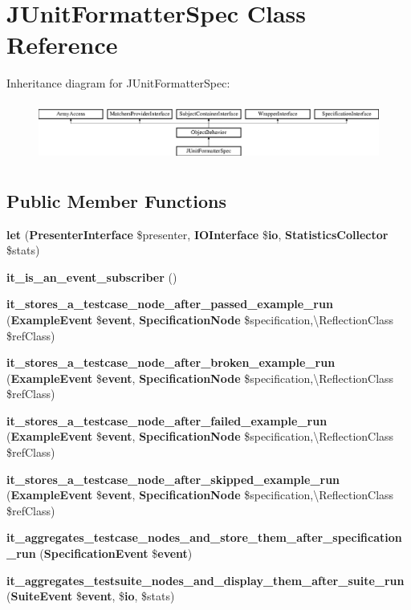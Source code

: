 \section{J\+Unit\+Formatter\+Spec Class Reference}
\label{classspec_1_1_php_spec_1_1_formatter_1_1_j_unit_formatter_spec}
Inheritance diagram for J\+Unit\+Formatter\+Spec\+:\begin{figure}[H]
\begin{center}
\leavevmode
\includegraphics[height=1.953488cm]{classspec_1_1_php_spec_1_1_formatter_1_1_j_unit_formatter_spec}
\end{center}
\end{figure}
\subsection*{Public Member Functions}
\begin{DoxyCompactItemize}
\item 
{\bf let} ({\bf Presenter\+Interface} \$presenter, {\bf I\+O\+Interface} \${\bf io}, {\bf Statistics\+Collector} \$stats)
\item 
{\bf it\+\_\+is\+\_\+an\+\_\+event\+\_\+subscriber} ()
\item 
{\bf it\+\_\+stores\+\_\+a\+\_\+testcase\+\_\+node\+\_\+after\+\_\+passed\+\_\+example\+\_\+run} ({\bf Example\+Event} \${\bf event}, {\bf Specification\+Node} \$specification,\textbackslash{}Reflection\+Class \$ref\+Class)
\item 
{\bf it\+\_\+stores\+\_\+a\+\_\+testcase\+\_\+node\+\_\+after\+\_\+broken\+\_\+example\+\_\+run} ({\bf Example\+Event} \${\bf event}, {\bf Specification\+Node} \$specification,\textbackslash{}Reflection\+Class \$ref\+Class)
\item 
{\bf it\+\_\+stores\+\_\+a\+\_\+testcase\+\_\+node\+\_\+after\+\_\+failed\+\_\+example\+\_\+run} ({\bf Example\+Event} \${\bf event}, {\bf Specification\+Node} \$specification,\textbackslash{}Reflection\+Class \$ref\+Class)
\item 
{\bf it\+\_\+stores\+\_\+a\+\_\+testcase\+\_\+node\+\_\+after\+\_\+skipped\+\_\+example\+\_\+run} ({\bf Example\+Event} \${\bf event}, {\bf Specification\+Node} \$specification,\textbackslash{}Reflection\+Class \$ref\+Class)
\item 
{\bf it\+\_\+aggregates\+\_\+testcase\+\_\+nodes\+\_\+and\+\_\+store\+\_\+them\+\_\+after\+\_\+specification\+\_\+run} ({\bf Specification\+Event} \${\bf event})
\item 
{\bf it\+\_\+aggregates\+\_\+testsuite\+\_\+nodes\+\_\+and\+\_\+display\+\_\+them\+\_\+after\+\_\+suite\+\_\+run} ({\bf Suite\+Event} \${\bf event}, \${\bf io}, \$stats)
\end{DoxyCompactItemize}
